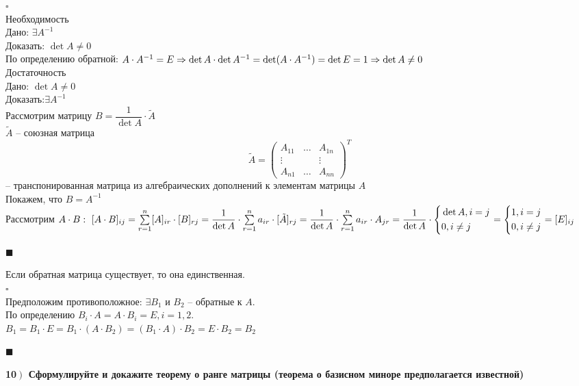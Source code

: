 \documentclass[a4paper,12pt]{article}
\newcommand*{\hm}[1]{#1\nobreak\discretionary{}
	{\hbox{$\mathsurround=0pt #1$}}{}}
\begin{document}
$\square$\\
Необходимость\\
Дано: $\exists A^{-1}$\\
Доказать: $\det A\ne0$\\
По определению обратной: $A\cdot A^{-1}=E\Rightarrow\det A\cdot\det A^{-1}=\det(A\cdot A^{-1})\hm{=}\det E=1\Rightarrow\det A\ne0$\\
Достаточность\\
Дано: $\det A\ne0$\\
Доказать:$\exists A^{-1}$\\
Рассмотрим матрицу $B=\dfrac{1}{\det A}\cdot \tilde A$\\
$\tilde A$ -- союзная матрица\\
\[
\tilde A=\begin{pmatrix}
A_{11}&\ldots&A_{1n}\\
\vdots&&\vdots\\
A_{n1}&\ldots&A_{nn}
\end{pmatrix}^T
\]
-- транспонированная матрица из алгебраических дополнений к элементам матрицы $A$\\
Покажем, что $B=A^{-1}$\\
Рассмотрим $A\cdot B: \text{ } [A\cdot B]_{ij}=\sum\limits_{r=1}^n [A]_{ir}\cdot [B]_{rj}=\dfrac{1}{\det A}\cdot \sum\limits_{r=1}^n a_{ir}\cdot[\tilde A]_{rj}\hm{=}\dfrac{1}{\det A}\cdot\sum\limits_{r=1}^n a_{ir}\cdot A_{jr}\hm{=}\dfrac{1}{\det A}\cdot\left\{
\begin{aligned}
&\det A, i=j\\
&0, i\ne j
\end{aligned}\right.=\left\{
\begin{aligned}
&1, i=j\\
&0, i\ne j
\end{aligned}\right.=[E]_{ij}$
\begin{flushright}
	$\blacksquare$
\end{flushright}
Если обратная матрица существует, то она единственная.\\
$\square$\\
Предположим противоположное: $\exists B_1$ и $B_2$ -- обратные к $A$.\\ По определению $B_i\cdot A=A\cdot B_i=E, i=1,2.$\\
$B_1=B_1\cdot E=B_1\cdot(A\cdot B_2)=(B_1\cdot A)\cdot B_2=E\cdot B_2=B_2$
\begin{flushright}
	$\blacksquare$
\end{flushright}
\textbf{10$\left.\right)$ Сформулируйте и докажите теорему о ранге матрицы (теорема о базисном миноре предполагается известной)}\\
\end{document}
